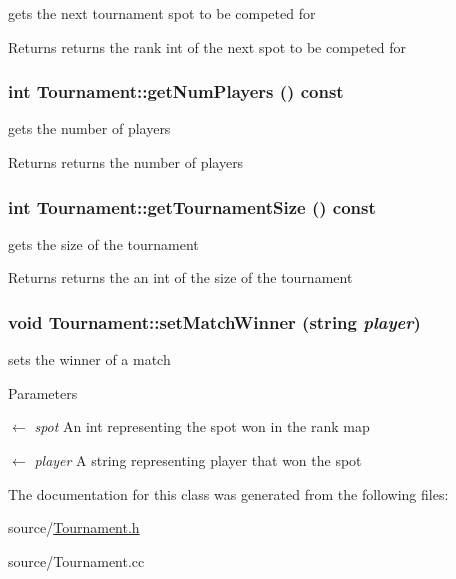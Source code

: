 gets the next tournament spot to be competed for \begin{DoxyReturn}{Returns}
returns the rank int of the next spot to be competed for 
\end{DoxyReturn}
\hypertarget{classTournament_aedbd40e56f31c1b82e6220a0ee167ea7}{
\subsubsection[{getNumPlayers}]{\setlength{\rightskip}{0pt plus 5cm}int Tournament::getNumPlayers () const}}
\label{classTournament_aedbd40e56f31c1b82e6220a0ee167ea7}


gets the number of players \begin{DoxyReturn}{Returns}
returns the number of players 
\end{DoxyReturn}
\hypertarget{classTournament_a89b96072f94fb1393f91b026e5c42665}{
\subsubsection[{getTournamentSize}]{\setlength{\rightskip}{0pt plus 5cm}int Tournament::getTournamentSize () const}}
\label{classTournament_a89b96072f94fb1393f91b026e5c42665}


gets the size of the tournament \begin{DoxyReturn}{Returns}
returns the an int of the size of the tournament 
\end{DoxyReturn}
\hypertarget{classTournament_afe626f769c595b0ea1004fbc2220194d}{
\subsubsection[{setMatchWinner}]{\setlength{\rightskip}{0pt plus 5cm}void Tournament::setMatchWinner (string {\em player})}}
\label{classTournament_afe626f769c595b0ea1004fbc2220194d}


sets the winner of a match 
\begin{DoxyParams}{Parameters}
\item[\mbox{$\leftarrow$} {\em spot}]An int representing the spot won in the rank map \item[\mbox{$\leftarrow$} {\em player}]A string representing player that won the spot \end{DoxyParams}


The documentation for this class was generated from the following files:\begin{DoxyCompactItemize}
\item 
source/\hyperlink{Tournament_8h}{Tournament.h}\item 
source/Tournament.cc\end{DoxyCompactItemize}
